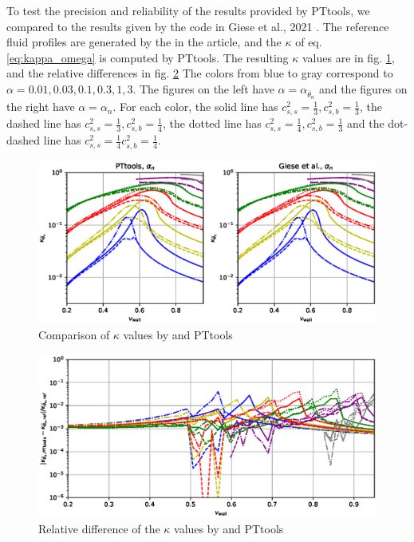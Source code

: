 To test the precision and reliability of the results provided by PTtools,
we compared to the results given by the code in  Giese et al., 2021 \cite[fig. 2]{giese_2021}.
The reference fluid profiles are generated by the in the article,
and the $\kappa$ of eq. \eqref{eq:kappa_omega} is computed by PTtools.
The resulting $\kappa$ values are in fig. \ref{fig:kappa_giese},
and the relative differences in fig. \ref{fig:kappa_giese_diff}
The colors from blue to gray correspond to $\alpha = 0.01, 0.03, 0.1, 0.3, 1, 3$.
The figures on the left have $\alpha = \alpha_{\bar{\theta}_n}$
and the figures on the right have $\alpha = \alpha_n$.
For each color, the solid line has $c_{s,s}^2 = \frac{1}{3}, c_{s,b}^2 = \frac{1}{3}$,
the dashed line has $c_{s,s}^2 = \frac{1}{3}, c_{s,b}^2 = \frac{1}{4}$,
the dotted line has $c_{s,s}^2 = \frac{1}{4}, c_{s,b}^2 = \frac{1}{3}$
and the dot-dashed line has $c_{s,s}^2 = \frac{1}{4} c_{s,b}^2 = \frac{1}{4}$.

\begin{figure}[ht!]
\centering
\includegraphics[width=\textwidth]{msc2-python/fig/giese_lisa_fig2_alpha_n.eps}
\caption{Comparison of $\kappa$ values by \cite[fig. 2]{giese_2021} and PTtools}
\label{fig:kappa_giese}
\end{figure}

\begin{figure}[ht!]
\centering
\includegraphics[width=\textwidth]{msc2-python/fig/giese_lisa_fig2_alpha_n_diff.eps}
\caption{Relative difference of the $\kappa$ values by \cite[fig. 2]{giese_2021} and PTtools}
\label{fig:kappa_giese_diff}
\end{figure}

